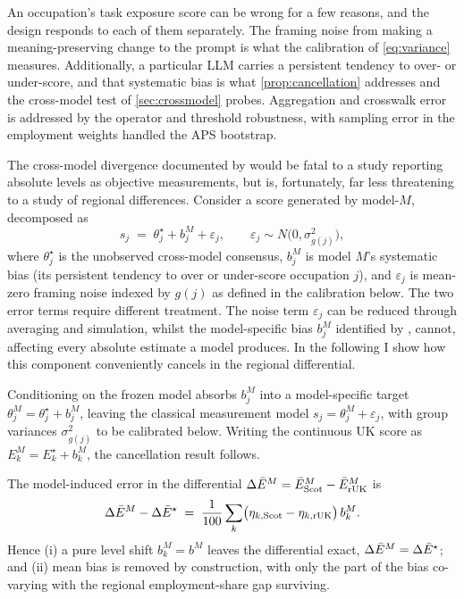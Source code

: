 An occupation's task exposure score can be wrong for a few reasons, and the design responds to each of them separately. The framing noise from making a meaning-preserving change to the prompt is what the calibration of \cref{eq:variance} measures. Additionally, a particular LLM carries a persistent tendency to over- or under-score, and that systematic bias \citep{yin2026} is what \cref{prop:cancellation} addresses and the cross-model test of \cref{sec:crossmodel} probes. Aggregation and crosswalk error is addressed by the operator and threshold robustness, with sampling error in the employment weights handled the APS bootstrap.

The cross-model divergence documented by \citet{yin2026} would be fatal to a study reporting absolute levels as objective measurements, but is, fortunately, far less threatening to a study of regional differences. Consider a score generated by model-$M$, decomposed as
\begin{equation}\label{eq:decomposition}
s_j \;=\; \theta^{\star}_j + b^{M}_j + \varepsilon_j,
\qquad
\varepsilon_j \sim N\bigl(0, \sigma^2_{g(j)}\bigr),
\end{equation}
where $\theta^{\star}_j$ is the unobserved cross-model consensus, $b^{M}_j$ is model $M$'s systematic bias (its persistent tendency to over or under-score occupation $j$), and $\varepsilon_j$ is mean-zero framing noise indexed by $g(j)$ as defined in the calibration below. The two error terms require different treatment. The noise term $\varepsilon_j$ can be reduced through averaging and simulation, whilst the model-specific bias $b^{M}_j$ identified by \citet{yin2026}, cannot, affecting every absolute estimate a model produces. In the following I show how this component conveniently cancels in the regional differential.

Conditioning on the frozen model absorbs $b^{M}_j$ into a model-specific target $\theta^{M}_j = \theta^{\star}_j + b^{M}_j$, leaving the classical measurement model $s_j = \theta^{M}_j + \varepsilon_j$, with group variances $\sigma^2_{g(j)}$ to be calibrated below. Writing the continuous UK score as $E^{M}_k = E^{\star}_k + b^{M}_k$, the cancellation result follows.

\begin{proposition}\label{prop:cancellation}
The model-induced error in the differential $\Delta\bar{E}^{M} = \bar{E}^{M}_{\mathrm{Scot}} - \bar{E}^{M}_{\mathrm{rUK}}$ is
\begin{equation}\label{eq:prop1}
\Delta\bar{E}^{M} - \Delta\bar{E}^{\star} \;=\;
\frac{1}{100} \sum_k \bigl(\eta_{k,\mathrm{Scot}} - \eta_{k,\mathrm{rUK}}\bigr)\,
b^{M}_k .
\end{equation}
Hence (i) a pure level shift $b^{M}_k = b^{M}$ leaves the differential exact, $\Delta\bar{E}^{M} = \Delta\bar{E}^{\star}$; and (ii) mean bias is removed by construction, with only the part of the bias co-varying with the regional employment-share gap surviving.
\end{proposition}

